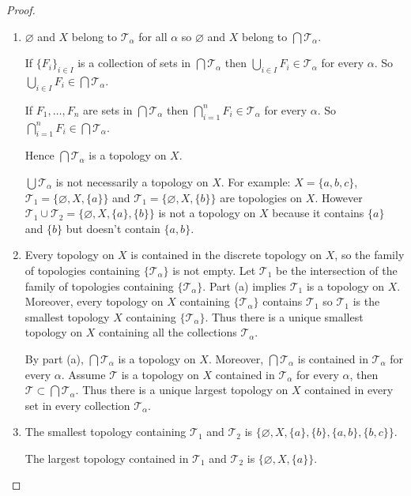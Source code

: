 \begin{proof}
    \begin{enumerate}[label={(\alph*)}]
        \item $\varnothing$ and $X$ belong to $\mathscr{T}_{\alpha}$ for all $\alpha$ so $\varnothing$ and $X$ belong to $\bigcap\mathscr{T}_{\alpha}$.

              If ${\{F_{i}\}}_{i\in I}$ is a collection of sets in $\bigcap\mathscr{T}_{\alpha}$ then $\bigcup_{i\in I}F_{i}\in \mathscr{T}_{\alpha}$ for every $\alpha$. So $\bigcup_{i\in I}F_{i}\in \bigcap\mathscr{T}_{\alpha}$.

              If $F_{1}, \ldots, F_{n}$ are sets in $\bigcap\mathscr{T}_{\alpha}$ then $\bigcap^{n}_{i=1}F_{i}\in \mathscr{T}_{\alpha}$ for every $\alpha$. So $\bigcap^{n}_{i=1}F_{i}\in \bigcap\mathscr{T}_{\alpha}$.

              Hence $\bigcap\mathscr{T}_{\alpha}$ is a topology on $X$.

              \bigskip
              $\bigcup\mathscr{T}_{\alpha}$ is not necessarily a topology on $X$. For example: $X = \{ a, b, c \}$, $\mathscr{T}_{1} = \{ \varnothing, X, \{ a \} \}$ and $\mathscr{T}_{1} = \{ \varnothing, X, \{ b \} \}$ are topologies on $X$. However $\mathscr{T}_{1}\cup\mathscr{T}_{2} = \{ \varnothing, X, \{ a \}, \{ b \} \}$ is not a topology on $X$ because it contains $\{ a \}$ and $\{ b \}$ but doesn't contain $\{ a, b \}$.
        \item Every topology on $X$ is contained in the discrete topology on $X$, so the family of topologies containing $\{ \mathscr{T}_{\alpha} \}$ is not empty. Let $\mathcal{T}_{1}$ be the intersection of the family of topologies containing $\{ \mathscr{T}_{\alpha} \}$. Part (a) implies $\mathcal{T}_{1}$ is a topology on $X$. Moreover, every topology on $X$ containing $\{\mathscr{T}_{\alpha}\}$ contains $\mathcal{T}_{1}$ so $\mathcal{T}_{1}$ is the smallest topology $X$ containing $\{\mathscr{T}_{\alpha}\}$. Thus there is a unique smallest topology on $X$ containing all the collections $\mathscr{T}_{\alpha}$.

              By part (a), $\bigcap \mathscr{T}_{\alpha}$ is a topology on $X$. Moreover, $\bigcap \mathscr{T}_{\alpha}$ is contained in $\mathscr{T}_{\alpha}$ for every $\alpha$. Assume $\mathscr{T}$ is a topology on $X$ contained in $\mathscr{T}_{\alpha}$ for every $\alpha$, then $\mathscr{T}\subset \bigcap \mathscr{T}_{\alpha}$. Thus there is a unique largest topology on $X$ contained in every set in every collection $\mathscr{T}_{\alpha}$.
        \item The smallest topology containing $\mathscr{T}_{1}$ and $\mathscr{T}_{2}$ is $\{ \varnothing, X, \{ a \}, \{ b \}, \{ a, b \}, \{ b, c \} \}$.

              The largest topology contained in $\mathscr{T}_{1}$ and $\mathscr{T}_{2}$ is $\{ \varnothing, X, \{ a \} \}$.
    \end{enumerate}
\end{proof}


